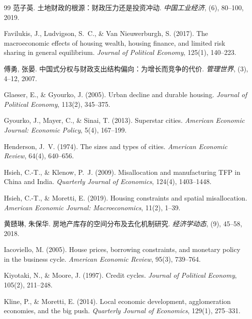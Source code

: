 \documentclass[UTF8,a4paper,12pt]{ctexart}
\theoremstyle{plain}
\theoremstyle{definition}
\theoremstyle{remark}
\begin{document}
\begin{thebibliography}{99}
范子英.
土地财政的根源：财政压力还是投资冲动.
\textit{中国工业经济}, (6), 80--100, 2019.

Favilukis, J., Ludvigson, S.~C., \& Van Nieuwerburgh, S. (2017).
The macroeconomic effects of housing wealth, housing finance,
and limited risk sharing in general equilibrium.
\textit{Journal of Political Economy}, 125(1), 140--223.

傅勇, 张晏.
中国式分权与财政支出结构偏向：为增长而竞争的代价.
\textit{管理世界}, (3), 4--12, 2007.

Glaeser, E., \& Gyourko, J. (2005).
Urban decline and durable housing.
\textit{Journal of Political Economy}, 113(2), 345--375.

Gyourko, J., Mayer, C., \& Sinai, T. (2013).
Superstar cities.
\textit{American Economic Journal: Economic Policy}, 5(4), 167--199.

Henderson, J.~V. (1974).
The sizes and types of cities.
\textit{American Economic Review}, 64(4), 640--656.

Hsieh, C.-T., \& Klenow, P.~J. (2009).
Misallocation and manufacturing TFP in China and India.
\textit{Quarterly Journal of Economics}, 124(4), 1403--1448.

Hsieh, C.-T., \& Moretti, E. (2019).
Housing constraints and spatial misallocation.
\textit{American Economic Journal: Macroeconomics}, 11(2), 1--39.

黄赜琳, 朱保华.
房地产库存的空间分布及去化机制研究.
\textit{经济学动态}, (9), 45--58, 2018.

Iacoviello, M. (2005).
House prices, borrowing constraints, and monetary policy in the business cycle.
\textit{American Economic Review}, 95(3), 739--764.

Kiyotaki, N., \& Moore, J. (1997).
Credit cycles.
\textit{Journal of Political Economy}, 105(2), 211--248.

Kline, P., \& Moretti, E. (2014).
Local economic development, agglomeration economies, and the big push.
\textit{Quarterly Journal of Economics}, 129(1), 275--331.


\end{thebibliography}
\end{document}
